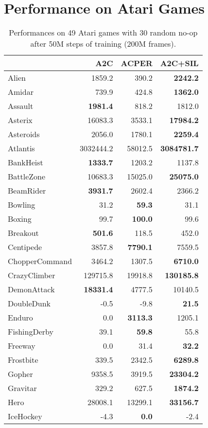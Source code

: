 \documentclass{article}
\begin{document}
\section{Performance on Atari Games}
\begin{table}[H]
\caption{Performances on 49 Atari games with 30 random no-op after 50M steps of training (200M frames).}
\small
\begin{center}
\begin{tabular}{ l| r r r }
\toprule
& A2C& ACPER & A2C+SIL\\
\midrule
Alien& 1859.2& 390.2& \textbf{2242.2}\\
Amidar& 739.9& 424.8& \textbf{1362.0}\\
Assault& \textbf{1981.4}& 818.2& 1812.0\\
Asterix& 16083.3& 3533.1& \textbf{17984.2}\\
Asteroids& 2056.0& 1780.1& \textbf{2259.4}\\
Atlantis& 3032444.2& 58012.5& \textbf{3084781.7}\\
BankHeist& \textbf{1333.7}& 1203.2& 1137.8\\
BattleZone& 10683.3& 15025.0& \textbf{25075.0}\\
BeamRider& \textbf{3931.7}& 2602.4& 2366.2\\
Bowling& 31.2& \textbf{59.3}& 31.1\\
Boxing& 99.7& \textbf{100.0}& 99.6\\
Breakout& \textbf{501.6}& 118.5& 452.0\\
Centipede& 3857.8& \textbf{7790.1}& 7559.5\\
ChopperCommand& 3464.2& 1307.5& \textbf{6710.0}\\
CrazyClimber& 129715.8& 19918.8& \textbf{130185.8}\\
DemonAttack& \textbf{18331.4}& 4777.5& 10140.5\\
DoubleDunk& -0.5& -9.8& \textbf{21.5}\\
Enduro& 0.0& \textbf{3113.3}& 1205.1\\
FishingDerby& 39.1& \textbf{59.8}& 55.8\\
Freeway& 0.0& 31.4& \textbf{32.2}\\
Frostbite& 339.5& 2342.5& \textbf{6289.8}\\
Gopher& 9358.5& 3919.5& \textbf{23304.2}\\
Gravitar& 329.2& 627.5& \textbf{1874.2}\\
Hero& 28008.1& 13299.1& \textbf{33156.7}\\
IceHockey& -4.3& \textbf{0.0}& -2.4\\

\end{tabular}
\end{center}
\end{table}
\end{document}
